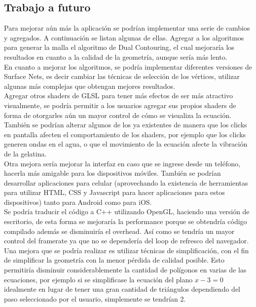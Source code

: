 \documentclass[12pt]{article}
\begin{document}
\subsection{Trabajo a futuro}
Para mejorar aún más la aplicación se podrían implementar una serie de cambios y agregados. A continuación se listan algunas de ellas.
Agregar a los algoritmos para generar la malla el algoritmo de Dual Contouring\cite{dualcontour}, el cual mejoraría los resultados en cuanto a la calidad de la geometría, aunque sería más lento. 
\\En cuanto a mejorar los algoritmos, se podría implementar diferentes versiones de Surface Nets, es decir cambiar las técnicas de selección de los vértices, utilizar algunas más complejas que obtengan mejores resultados.
\\Agregar otros shaders de GLSL para tener más efectos de ser más atractivo visualmente, se podría permitir a los usuarios agregar sus propios shaders de forma de otorgarles aún un mayor control de cómo se visualiza la ecuación. También se podrían alterar algunos de los ya existentes de manera que los clicks en pantalla afecten el comportamiento de los shaders, por ejemplo que los clicks generen ondas en el agua, o que el movimiento de la ecuación afecte la vibración de la gelatina.
\\Otra mejora sería mejorar la interfaz en caso que se ingrese desde un teléfono, hacerla más amigable para los dispositivos móviles.
También se podrían desarrollar aplicaciones para celular (aprovechando la existencia de herramientas para utilizar HTML, CSS y Javascript para hacer aplicaciones para estos dispositivos) tanto para Android como para iOS. 
\\Se podría traducir el código a C++ utilizando OpenGL, haciendo una versión de escritorio, de esta forma se mejoraría la performance porque se obtendría código compilado además se disminuiría el overhead. Así como se tendría un mayor control del framerate ya que no se dependería del loop de refresco del navegador.
\\Una mejora que se podría realizar es utilizar técnicas de simplificación\cite{simplificacion}\cite{realtimerendering}, con el fin de simplificar la geometría con la menor pérdida de calidad posible. Esto permitiría disminuir considerablemente la cantidad de polígonos en varias de las ecuaciones, por ejemplo si se simplificase la ecuación del plano $x-3=0$ idealmente en lugar de tener una gran cantidad de triángulos dependiendo del paso seleccionado por el usuario, simplemente se tendrían 2.
\end{document}
